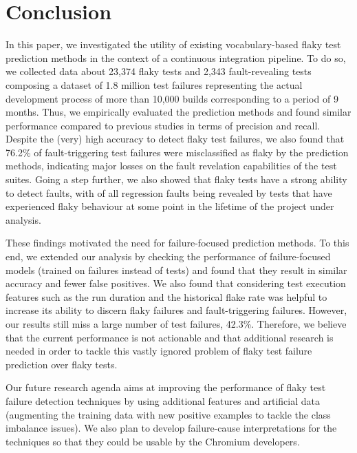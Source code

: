 \section{Conclusion}
\label{sec:chromium-conclusion}

In this paper, we investigated the utility of existing vocabulary-based flaky test prediction methods in the context of a continuous integration pipeline. To do so, we collected data about 23,374 flaky tests and 2,343 fault-revealing tests composing a dataset of 1.8 million test failures representing the actual development process of more than 10,000 builds corresponding to a period of 9 months. Thus, we empirically evaluated the prediction methods and found similar performance compared to previous studies in terms of precision and recall. Despite the (very) high accuracy to detect flaky test failures, we also found that 76.2\% of fault-triggering test failures were misclassified as flaky by the prediction methods, indicating major losses on the fault revelation capabilities of the test suites. Going a step further, we also showed that flaky tests have a strong ability to detect faults, with  of all regression faults being revealed by tests that have experienced flaky behaviour at some point in the lifetime of the project under analysis.

These findings motivated the need for failure-focused prediction methods. To this end, we extended our analysis by checking the performance of failure-focused models (trained on failures instead of tests) and found that they result in similar accuracy and fewer false positives. We also found that considering test execution features such as the run duration and the historical flake rate was helpful to increase its ability to discern flaky failures and fault-triggering failures. However, our results still miss a large number of test failures, 42.3\%. Therefore, we believe that the current performance is not actionable and that additional research is needed in order to tackle this vastly ignored problem of flaky test failure prediction over flaky tests.

Our future research agenda aims at improving the performance of flaky test failure detection techniques by using additional features and artificial data (augmenting the training data with new positive examples to tackle the class imbalance issues). We also plan to develop failure-cause interpretations for the techniques so that they could be usable by the Chromium developers.  